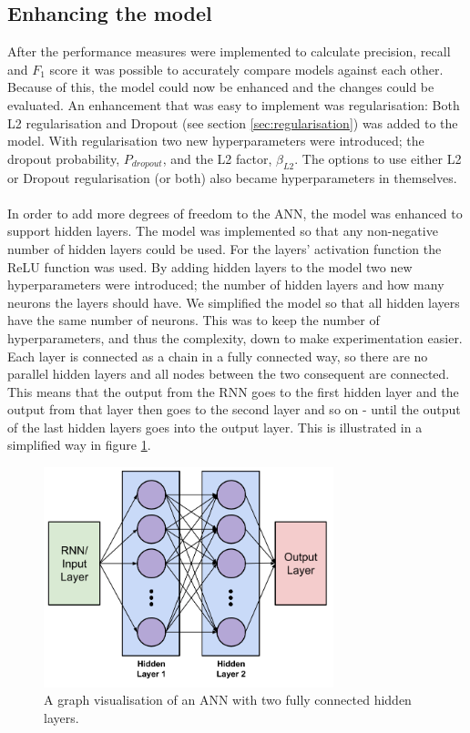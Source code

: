 \subsection{Enhancing the model}\label{sect:enhacing_the_model}
After the performance measures were implemented to calculate precision, recall and $F_1$ score it was possible to accurately compare models against each other. Because of this, the model could now be enhanced and the changes could be evaluated. An enhancement that was easy to implement was regularisation: Both L2 regularisation and Dropout (see section \ref{sec:regularisation}) was added to the model. With regularisation two new hyperparameters were introduced; the dropout probability, $P_{dropout}$, and the L2 factor, $\beta_{L2}$. The options to use either L2 or Dropout regularisation (or both) also became hyperparameters in themselves.
\\\\
In order to add more degrees of freedom to the ANN, the model was enhanced to support hidden layers. The model was implemented so that any non-negative number of hidden layers could be used. For the layers' activation function the ReLU function was used. By adding hidden layers to the model two new hyperparameters were introduced; the number of hidden layers and how many neurons the layers should have. We simplified the model so that all hidden layers have the same number of neurons. This was to keep the number of hyperparameters, and thus the complexity, down to make experimentation easier. Each layer is connected as a chain in a fully connected way, so there are no parallel hidden layers and all nodes between the two consequent are connected. This means that the output from the RNN goes to the first hidden layer and the output from that layer then goes to the second layer and so on - until the output of the last hidden layers goes into the output layer. This is illustrated in a simplified way in figure \ref{fig:ann_hidden_layers}.
\begin{figure}[h]
    \centering
    \includegraphics[width=0.75\textwidth]{figure/method/ann_hidden_layers}
    \caption{A graph visualisation of an ANN with two fully connected hidden layers.}
    \label{fig:ann_hidden_layers}
\end{figure}
